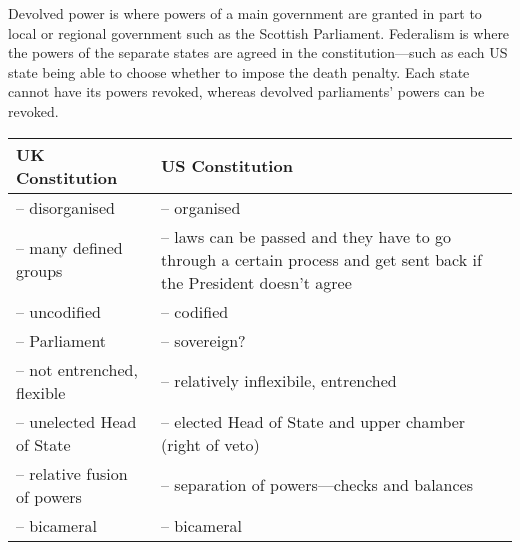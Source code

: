 \documentclass[12pt]{article}
\begin{document}
Devolved power is where powers of a main government are granted in part to local or regional government such as the Scottish Parliament.  Federalism is where the powers of the separate states are agreed in the constitution---such as each US state being able to choose whether to impose the death penalty.  Each state cannot have its powers revoked, whereas devolved parliaments' powers can be revoked.

\begin{center}
	\begin{tabular}{| p{5cm} | p{8cm} | }
		\hline
		UK Constitution & US Constitution\\
		\hline
		-- disorganised & -- organised\\
		-- many defined groups & -- laws can be passed and they have to go through a certain process and get sent back if the President doesn't agree\\
		-- uncodified & -- codified\\
		-- Parliament & -- sovereign?\\
		-- not entrenched, flexible & -- relatively inflexibile, entrenched\\
		-- unelected Head of State & -- elected Head of State and upper chamber (right of veto)\\
		-- relative fusion of powers & -- separation of powers---checks and balances\\
		-- bicameral & -- bicameral\\
		\hline
	\end{tabular}
\end{center}
\end{document}
